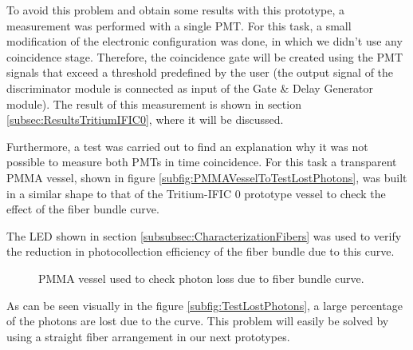 To avoid this problem and obtain some results with this prototype, a measurement was performed with a single PMT. For this task, a small modification of the electronic configuration was done, in which we didn't use any coincidence stage. Therefore, the coincidence gate will be created using the PMT signals that exceed a threshold predefined by the user (the output signal of the discriminator module is connected as input of the Gate \& Delay Generator module). The result of this measurement is shown in section \ref{subsec:ResultsTritiumIFIC0}, where it will be discussed.

Furthermore, a test was carried out to find an explanation why it was not possible to measure both PMTs in time coincidence. For this task a transparent PMMA vessel, shown in figure \ref{subfig:PMMAVesselToTestLostPhotons}, was built in a similar shape to that of the Tritium-IFIC 0 prototype vessel to check the effect of the fiber bundle curve. 

The LED shown in section \ref{subsubsec:CharacterizationFibers} was used to verify the reduction in photocollection efficiency of the fiber bundle due to this curve. 

\begin{figure}[h]
 \centering
 \caption{PMMA vessel used to check photon loss due to fiber bundle curve.}
 \label{fig:TestLostPhotons}
\end{figure}

As can be seen visually in the figure \ref{subfig:TestLostPhotons}, a large percentage of the photons are lost due to the curve. This problem will easily be solved by using a straight fiber arrangement in our next prototypes.


